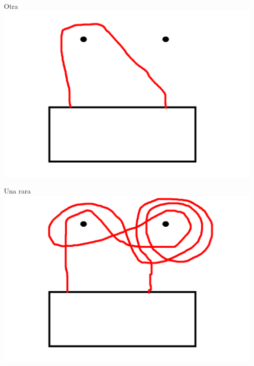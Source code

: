 \documentclass[11pt]{beamer}
\begin{document}
\begin{frame}{Otra}
	\includegraphics[scale=0.4]{images/x_without.png}
	
\end{frame}

\begin{frame}{Una rara}
	\includegraphics[scale=0.4]{images/config3.png}
	
	
	
	
\end{frame}
\end{document}
